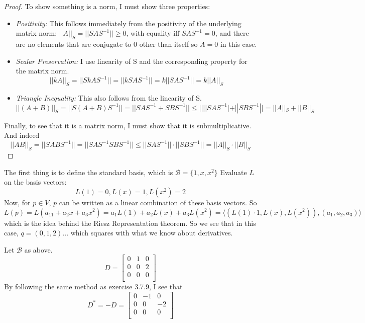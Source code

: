 \documentclass[12pt]{article}
\newenvironment{problem}[2][Problem]{\begin{trivlist}
\item[\hskip \labelsep {\bfseries #1}\hskip \labelsep {\bfseries #2.}]}{\end{trivlist}}
\theoremstyle{definition}
\theoremstyle{definition}
\theoremstyle{definition}
\theoremstyle{definition}
\begin{document}
\begin{problem}{3.30} \begin{proof}
To show something is a norm, I must show three properties:
\begin{itemize}
\item \textit{Positivity:} This follows immediately from the positivity of the underlying matrix norm: $ ||A||_S = ||SAS^{-1}|| \geq 0$, with equality iff $SAS^{-1} = 0$, and there are no elements that are conjugate to $0$ other than itself so $A = 0$ in this case.  
\item \textit{Scalar Preservation:} I use linearity of S and the corresponding property for the matrix norm. 
$$ ||kA||_S = ||SkAS^{-1}|| = ||kSAS^{-1}|| = k||SAS^{-1}|| = k||A||_S $$
\item \textit{Triangle Inequality:} This also follows from the linearity of S. 
$$||(A+B)||_S = ||S(A+B)S^{-1}|| = ||SAS^{-1}+ SBS^{-1}|| \leq || ||SAS^{-1}| + ||SBS^{-1}|| = ||A||_S + ||B||_S $$
\end{itemize}
Finally, to see that it is a matrix norm, I must show that it is submultiplicative. And indeed 
$$||AB||_S = ||SABS^{-1}|| = ||SAS^{-1}SBS^{-1} || \leq ||SAS^{-1}||\cdot||SBS^{-1}|| = ||A||_S \cdot ||B||_S $$
\end{proof}
\end{problem}

\begin{problem}{3.37}
The first thing is to define the standard basis, which is $\mathcal{B} = \{1, x, x^2\}$ Evaluate $L$ on the basis vectors: 
$$L(1) = 0, L(x) = 1, L(x^2) = 2$$
Now, for $p \in V$, $p$ can be written as a linear combination of these basis vectors. So 
$$ L(p) = L(a_11 + a_2x + a_3x^2) = a_1L(1) +a_2 L(x) + a_3 L(x^2) = \langle (L(1)\cdot 1, L(x), L(x^2)) , (a_1, a_2, a_3) \rangle$$
which is the idea behind the Riesz Representation theorem. So we see that in this case, $q = (0, 1, 2)$... which squares with  what we know about derivatives.
\end{problem}

\begin{problem}{3.38} Let $\mathcal{B}$ as above.
$$
D = \begin{bmatrix}
0 & 1 & 0\\
0 & 0 & 2\\
0 & 0 & 0\\
\end{bmatrix}
$$
By following the same method as exercise 3.7.9, I see that 
$$D^* = -D = \begin{bmatrix}
0 & -1 & 0\\
0 & 0 & -2\\
0 & 0 & 0\\
\end{bmatrix}  $$
\end{problem}
\end{document}
